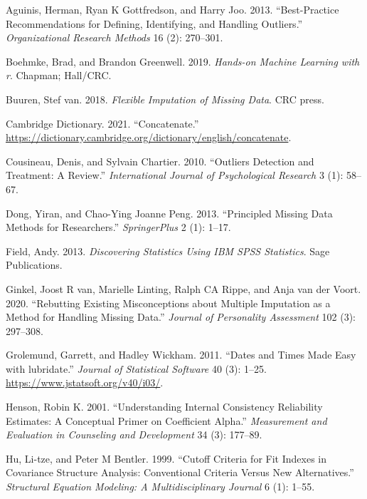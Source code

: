 \documentclass[
  letterpaper,
]{krantz}
\newlength{\cslhangindent}
\newenvironment{CSLReferences}[2] %
 {\begin{list}{}{%
  \setlength{\itemindent}{0pt}
  \setlength{\leftmargin}{0pt}
  \setlength{\parsep}{0pt}
  \ifodd #1
   \setlength{\leftmargin}{\cslhangindent}
   \setlength{\itemindent}{-1\cslhangindent}
  \fi
  \setlength{\itemsep}{#2\baselineskip}}}
 {\end{list}}
\begin{document}
\label{refs}
\begin{CSLReferences}{1}{0}
Aguinis, Herman, Ryan K Gottfredson, and Harry Joo. 2013.
{``Best-Practice Recommendations for Defining, Identifying, and Handling
Outliers.''} \emph{Organizational Research Methods} 16 (2): 270--301.

Boehmke, Brad, and Brandon Greenwell. 2019. \emph{Hands-on Machine
Learning with r}. Chapman; Hall/CRC.

Buuren, Stef van. 2018. \emph{Flexible Imputation of Missing Data}. CRC
press.

Cambridge Dictionary. 2021. {``Concatenate.''}
\url{https://dictionary.cambridge.org/dictionary/english/concatenate}.

Cousineau, Denis, and Sylvain Chartier. 2010. {``Outliers Detection and
Treatment: A Review.''} \emph{International Journal of Psychological
Research} 3 (1): 58--67.

Dong, Yiran, and Chao-Ying Joanne Peng. 2013. {``Principled Missing Data
Methods for Researchers.''} \emph{SpringerPlus} 2 (1): 1--17.

Field, Andy. 2013. \emph{Discovering Statistics Using IBM SPSS
Statistics}. Sage Publications.

Ginkel, Joost R van, Marielle Linting, Ralph CA Rippe, and Anja van der
Voort. 2020. {``Rebutting Existing Misconceptions about Multiple
Imputation as a Method for Handling Missing Data.''} \emph{Journal of
Personality Assessment} 102 (3): 297--308.

Grolemund, Garrett, and Hadley Wickham. 2011. {``Dates and Times Made
Easy with {lubridate}.''} \emph{Journal of Statistical Software} 40 (3):
1--25. \url{https://www.jstatsoft.org/v40/i03/}.

Henson, Robin K. 2001. {``Understanding Internal Consistency Reliability
Estimates: A Conceptual Primer on Coefficient Alpha.''}
\emph{Measurement and Evaluation in Counseling and Development} 34 (3):
177--89.

Hu, Li-tze, and Peter M Bentler. 1999. {``Cutoff Criteria for Fit
Indexes in Covariance Structure Analysis: Conventional Criteria Versus
New Alternatives.''} \emph{Structural Equation Modeling: A
Multidisciplinary Journal} 6 (1): 1--55.


\end{CSLReferences}
\end{document}
